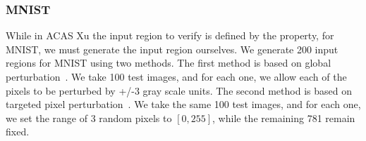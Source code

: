 \subsubsection{MNIST}

While in ACAS Xu the input region to verify is defined by the
property, for MNIST, we must generate the input region ourselves. We
generate 200 input regions for MNIST using two methods. The first
method is based on global perturbation~\cite{SinghGPV19}. We take 100
test images, and for each one, we allow each of the pixels to be
perturbed by +/-3 gray scale units. The second method is based on
targeted pixel perturbation~\cite{GopinathPWZK19,GopinathKPB18}. We
take the same 100 test images, and for each one, we set the range of 3 random
pixels to $ [0,255] $, while the remaining 781 remain fixed.

\begin{table}
\centering
\caption{Accuracy comparison of the three tools on MNIST.}
\label{tbl:MNIST_accuracy}
\end{table}

